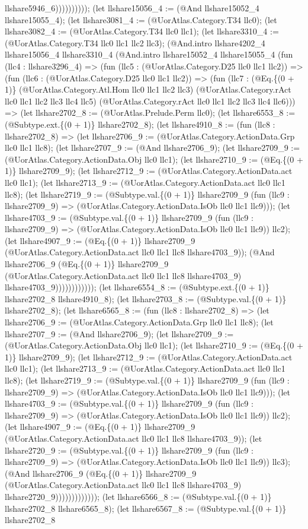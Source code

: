 \documentclass[11pt]{article}
\begin{document}
llshare5946\_6)))))))))); (let llshare15056\_4 := (@And llshare15052\_4 llshare15055\_4); (let llshare3081\_4 := (@UorAtlas.Category.T34 llc0); (let llshare3082\_4 := (@UorAtlas.Category.T34 llc0 llc1); (let llshare3310\_4 := (@UorAtlas.Category.T34 llc0 llc1 llc2 llc3); (@And.intro llshare4202\_4 llshare15056\_4 llshare3310\_4 (@And.intro llshare15052\_4 llshare15055\_4 (fun (llc4 : llshare3296\_4) => (fun (llc5 : (@UorAtlas.Category.D25 llc0 llc1 llc2)) => (fun (llc6 : (@UorAtlas.Category.D25 llc0 llc1 llc2)) => (fun (llc7 : (@Eq.\{(0 + 1)\} (@UorAtlas.Category.Atl.Hom llc0 llc1 llc2 llc3) (@UorAtlas.Category.rAct llc0 llc1 llc2 llc3 llc4 llc5) (@UorAtlas.Category.rAct llc0 llc1 llc2 llc3 llc4 llc6))) => (let llshare2702\_8 := (@UorAtlas.Prelude.Perm llc0); (let llshare6553\_8 := (@Subtype.ext.\{(0 + 1)\} llshare2702\_8); (let llshare4910\_8 := (fun (llc8 : llshare2702\_8) => (let llshare2706\_9 := (@UorAtlas.Category.ActionData.Grp llc0 llc1 llc8); (let llshare2707\_9 := (@And llshare2706\_9); (let llshare2709\_9 := (@UorAtlas.Category.ActionData.Obj llc0 llc1); (let llshare2710\_9 := (@Eq.\{(0 + 1)\} llshare2709\_9); (let llshare2712\_9 := (@UorAtlas.Category.ActionData.act llc0 llc1); (let llshare2713\_9 := (@UorAtlas.Category.ActionData.act llc0 llc1 llc8); (let llshare2719\_9 := (@Subtype.val.\{(0 + 1)\} llshare2709\_9 (fun (llc9 : llshare2709\_9) => (@UorAtlas.Category.ActionData.IsOb llc0 llc1 llc9))); (let llshare4703\_9 := (@Subtype.val.\{(0 + 1)\} llshare2709\_9 (fun (llc9 : llshare2709\_9) => (@UorAtlas.Category.ActionData.IsOb llc0 llc1 llc9)) llc2); (let llshare4907\_9 := (@Eq.\{(0 + 1)\} llshare2709\_9 (@UorAtlas.Category.ActionData.act llc0 llc1 llc8 llshare4703\_9)); (@And llshare2706\_9 (@Eq.\{(0 + 1)\} llshare2709\_9 (@UorAtlas.Category.ActionData.act llc0 llc1 llc8 llshare4703\_9) llshare4703\_9)))))))))))); (let llshare6554\_8 := (@Subtype.ext.\{(0 + 1)\} llshare2702\_8 llshare4910\_8); (let llshare2703\_8 := (@Subtype.val.\{(0 + 1)\} llshare2702\_8); (let llshare6565\_8 := (fun (llc8 : llshare2702\_8) => (let llshare2706\_9 := (@UorAtlas.Category.ActionData.Grp llc0 llc1 llc8); (let llshare2707\_9 := (@And llshare2706\_9); (let llshare2709\_9 := (@UorAtlas.Category.ActionData.Obj llc0 llc1); (let llshare2710\_9 := (@Eq.\{(0 + 1)\} llshare2709\_9); (let llshare2712\_9 := (@UorAtlas.Category.ActionData.act llc0 llc1); (let llshare2713\_9 := (@UorAtlas.Category.ActionData.act llc0 llc1 llc8); (let llshare2719\_9 := (@Subtype.val.\{(0 + 1)\} llshare2709\_9 (fun (llc9 : llshare2709\_9) => (@UorAtlas.Category.ActionData.IsOb llc0 llc1 llc9))); (let llshare4703\_9 := (@Subtype.val.\{(0 + 1)\} llshare2709\_9 (fun (llc9 : llshare2709\_9) => (@UorAtlas.Category.ActionData.IsOb llc0 llc1 llc9)) llc2); (let llshare4907\_9 := (@Eq.\{(0 + 1)\} llshare2709\_9 (@UorAtlas.Category.ActionData.act llc0 llc1 llc8 llshare4703\_9)); (let llshare2720\_9 := (@Subtype.val.\{(0 + 1)\} llshare2709\_9 (fun (llc9 : llshare2709\_9) => (@UorAtlas.Category.ActionData.IsOb llc0 llc1 llc9)) llc3); (@And llshare2706\_9 (@Eq.\{(0 + 1)\} llshare2709\_9 (@UorAtlas.Category.ActionData.act llc0 llc1 llc8 llshare4703\_9) llshare2720\_9))))))))))))); (let llshare6566\_8 := (@Subtype.val.\{(0 + 1)\} llshare2702\_8 llshare6565\_8); (let llshare6567\_8 := (@Subtype.val.\{(0 + 1)\} llshare2702\_8 
\end{document}
